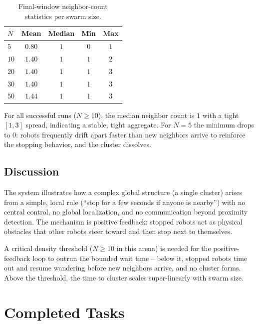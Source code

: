 \documentclass[12pt, a4paper]{article}
\begin{document}
\begin{table}[h]
\centering
\begin{tabular}{lcccc}
\toprule
\textbf{$N$} & \textbf{Mean} & \textbf{Median} & \textbf{Min} & \textbf{Max} \\
\midrule
$5$  & $0.80$ & $1$ & $0$ & $1$ \\
$10$ & $1.40$ & $1$ & $1$ & $2$ \\
$20$ & $1.40$ & $1$ & $1$ & $3$ \\
$30$ & $1.40$ & $1$ & $1$ & $3$ \\
$50$ & $1.44$ & $1$ & $1$ & $3$ \\
\bottomrule
\end{tabular}
\caption{Final-window neighbor-count statistics per swarm size.}
\label{tab:task2-stab}
\end{table}

For all successful runs ($N \geq 10$), the median neighbor count is $1$ with
a tight $[1, 3]$ spread, indicating a stable, tight aggregate.  For $N = 5$
the minimum drops to $0$: robots frequently drift apart faster than new
neighbors arrive to reinforce the stopping behavior, and the cluster
dissolves.

\subsection{Discussion}

The system illustrates how a complex global structure (a single cluster)
arises from a simple, local rule (``stop for a few seconds if anyone is
nearby'') with no central control, no global localization, and no
communication beyond proximity detection.  The mechanism is positive
feedback: stopped robots act as physical obstacles that other robots steer
toward and then stop next to themselves.

A critical density threshold ($N \geq 10$ in this arena) is needed for the
positive-feedback loop to outrun the bounded wait time -- below it, stopped
robots time out and resume wandering before new neighbors arrive, and no
cluster forms.  Above the threshold, the time to cluster scales
super-linearly with swarm size.

\newpage
\section{Completed Tasks}
\end{document}
